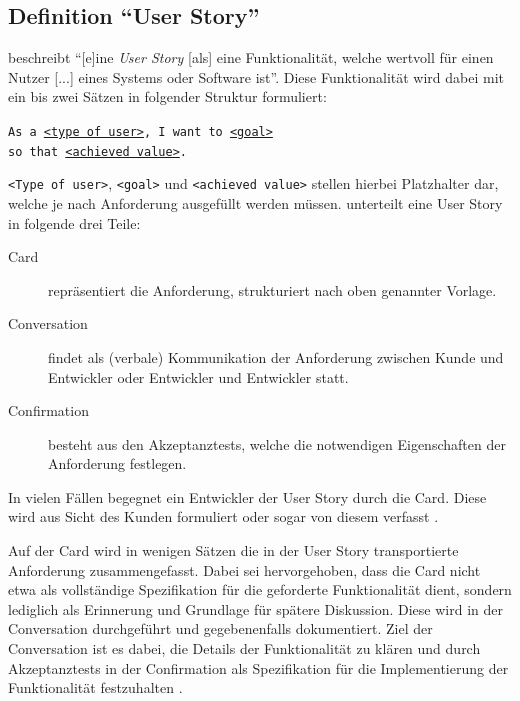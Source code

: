 \documentclass[acmtog]{acmart}
\begin{document}
\subsection{Definition ``User Story''}
\cite[p. 4]{cohn_user_2004} beschreibt ``[e]ine \emph{User Story} [als] eine Funktionalität, welche wertvoll für einen Nutzer [...] eines Systems
oder Software ist''.
Diese Funktionalität wird dabei mit ein bis zwei Sätzen in folgender Struktur formuliert:

\vspace{1em}
\texttt{As a \underline{<type of user>}, I want to \underline{<goal>}\\
	\hspace*{13em} so that \underline{<achieved value>}.}
\begin{flushright}
	\cite[p. 499]{balzert09}
\end{flushright}


\vspace{.5em}

\verb|<Type of user>|, \verb|<goal>| und \verb|<achieved value>| stellen hierbei Platzhalter dar,
welche je nach Anforderung ausgefüllt werden müssen.
\cite{jeffries_essential_2001} unterteilt eine User Story in folgende drei Teile:
\begin{description}
	\item[Card] repräsentiert die Anforderung, strukturiert nach oben genannter Vorlage.
	\item[Conversation] findet als (verbale) Kommunikation der Anforderung zwischen Kunde und Entwickler oder Entwickler und Entwickler statt.
	\item[Confirmation] besteht aus den Akzeptanztests, welche die notwendigen Eigenschaften der Anforderung festlegen.
\end{description}

In vielen Fällen begegnet ein Entwickler der User Story durch die Card.
Diese wird aus Sicht des Kunden formuliert oder sogar von diesem verfasst \cite[p. 497]{balzert09}.

Auf der Card wird in wenigen Sätzen die in der User Story transportierte Anforderung zusammengefasst.
Dabei sei hervorgehoben, dass die Card nicht etwa als vollständige Spezifikation für die geforderte Funktionalität dient,
sondern lediglich als Erinnerung und Grundlage für spätere Diskussion.
Diese wird in der Conversation durchgeführt und gegebenenfalls dokumentiert.
Ziel der Conversation ist es dabei, die Details der Funktionalität zu klären
und durch Akzeptanztests in der Confirmation als Spezifikation für die Implementierung
der Funktionalität festzuhalten \cite[p. 4]{cohn_user_2004}.
\end{document}

